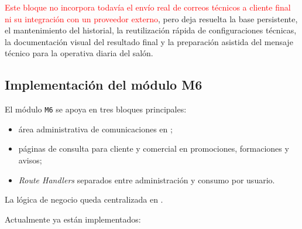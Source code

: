\textcolor{red}{Este bloque no incorpora todavía el envío real de correos técnicos a cliente final ni su integración con un proveedor externo}, pero deja resuelta la base persistente, el mantenimiento del historial, la reutilización rápida de configuraciones técnicas, la documentación visual del resultado final y la preparación asistida del mensaje técnico para la operativa diaria del salón.

\subsection{Implementación del módulo M6}

El módulo \texttt{M6} se apoya en tres bloques principales:

\begin{itemize}
    \item área administrativa de comunicaciones en ;
    \item páginas de consulta para cliente y comercial en promociones, formaciones y avisos;
    \item \textit{Route Handlers} separados entre administración y consumo por usuario.
\end{itemize}

La lógica de negocio queda centralizada en .

Actualmente ya están implementados:

